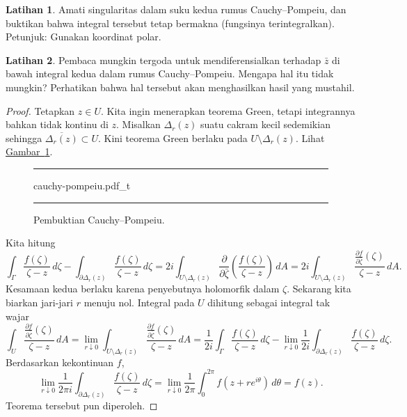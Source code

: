 \documentclass[12pt,openany]{book}
\theoremstyle{plain}
\theoremstyle{remark}
\theoremstyle{definition}
\newenvironment{exbox}{%
    \def\FrameCommand{\vrule width 1pt \relax\hspace{10pt}}%
    \MakeFramed{\advance\hsize-\width\FrameRestore}%
}{%
    \endMakeFramed
}
\newenvironment{myfig}{%
\begin{figure}[h!t]
\noindent\rule{\textwidth}{0.5pt}\vspace{12pt}\par\centering}%
{\par\noindent\rule{\textwidth}{0.5pt}
\end{figure}}
\theoremstyle{exercise}
\newtheorem{exercise}{Latihan}[section]
\theoremstyle{example}
\newcommand{\figureref}[1]{\hyperref[#1]{Gambar~\ref*{#1}}}
\begin{document}
\begin{exbox}
\begin{exercise}
Amati singularitas dalam suku kedua rumus Cauchy--Pompeiu,
dan buktikan bahwa integral tersebut tetap
bermakna (fungsinya terintegralkan). Petunjuk: Gunakan koordinat polar.
\end{exercise}

\begin{exercise}
Pembaca mungkin tergoda untuk
mendiferensialkan terhadap $\bar{z}$ di bawah integral kedua dalam 
rumus Cauchy--Pompeiu. Mengapa hal itu tidak mungkin?
Perhatikan bahwa hal tersebut akan menghasilkan hasil yang mustahil.
\end{exercise}
\end{exbox}

\begin{proof}
Tetapkan $z \in U$. Kita ingin menerapkan teorema Green,
tetapi integrannya bahkan tidak kontinu di $z$.
Misalkan $\Delta_r(z)$ suatu cakram kecil sedemikian sehingga
$\overline{\Delta_r(z)} \subset U$. Kini teorema Green berlaku pada $U \setminus \Delta_r(z)$. Lihat
\figureref{fig:cauchypompeiu}.
\begin{myfig}
{cauchy-pompeiu.pdf_t}
\caption{Pembuktian Cauchy--Pompeiu.\label{fig:cauchypompeiu}}
\end{myfig}
Kita hitung
\begin{equation*}
\int_{\Gamma} \frac{f(\zeta)}{\zeta-z}\,  d\zeta - 
\int_{\partial \Delta_r(z)} \frac{f(\zeta)}{\zeta-z}\,  d\zeta
=
2i
\int_{U \setminus \Delta_r(z)} \frac{\partial}{\partial \bar{\zeta}} \left(
\frac{f(\zeta)}{\zeta-z} \right) \, dA
=
2i
\int_{U \setminus \Delta_r(z)}  
\frac{\frac{\partial f}{\partial \bar{\zeta}}(\zeta)}{\zeta-z} \, dA .
\end{equation*}
Kesamaan kedua berlaku karena penyebutnya holomorfik dalam
$\zeta$.
Sekarang kita biarkan jari-jari $r$ menuju nol.
Integral pada $U$ dihitung sebagai integral tak wajar
\begin{equation*}
\int_{U} \frac{\frac{\partial f}{\partial
\bar{\zeta}}(\zeta)}{\zeta-z} \, dA
=
\lim_{r \downarrow 0}
\int_{U \setminus \Delta_r(z)} \frac{\frac{\partial f}{\partial
\bar{\zeta}}(\zeta)}{\zeta-z} \, dA
=
\frac{1}{2i}
\int_{\Gamma} \frac{f(\zeta)}{\zeta-z}\,  d\zeta
- 
\lim_{r \downarrow 0}
\frac{1}{2i}
\int_{\partial \Delta_r(z)} \frac{f(\zeta)}{\zeta-z}\,  d\zeta .
\end{equation*}
Berdasarkan kekontinuan $f$,
\begin{equation*}
\lim_{r \downarrow 0}
\frac{1}{2\pi i}
\int_{\partial \Delta_r(z)} \frac{f(\zeta)}{\zeta-z}\,  d\zeta
=
\lim_{r \downarrow 0}
\frac{1}{2\pi}
\int_0^{2\pi} f(z + r e^{i\theta})\, d\theta
=
f(z) .
\end{equation*}
Teorema tersebut pun diperoleh.
\end{proof}
\end{document}
